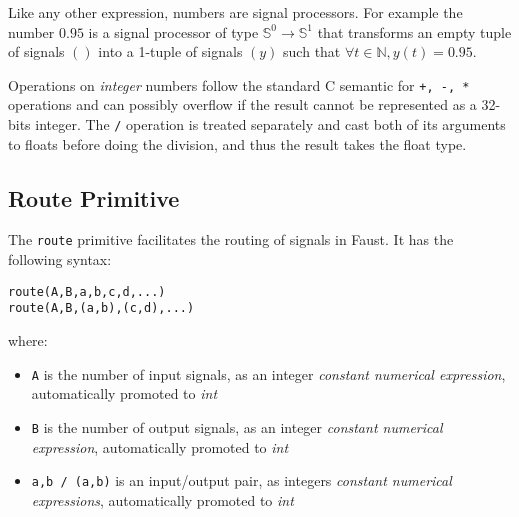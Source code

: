 Like any other \faust expression, numbers are signal processors. For example the number $0.95$ is a signal processor of type $\mathbb{S}^{0}\rightarrow\mathbb{S}^{1}$ that transforms an empty tuple of signals $()$ into a 1-tuple of signals $(y)$ such that $\forall t\in\mathbb{N}, y(t)=0.95$.

Operations on \textit{integer} numbers follow the standard C semantic for \lstinline'+, -, *' operations and can possibly overflow if the result cannot be represented as a 32-bits integer. The \lstinline'/' operation is treated separately and cast both of its arguments to floats before doing the division, and thus the result takes the float type.



\subsection{Route Primitive }

The  \lstinline'route' primitive facilitates the routing of signals in Faust. It has the following syntax:

\begin{lstlisting}
route(A,B,a,b,c,d,...)
route(A,B,(a,b),(c,d),...)
\end{lstlisting}

where:

\begin{itemize}
	\item \lstinline'A' is the number of input signals, as an integer \textit{constant numerical expression}, automatically promoted to \textit{int}
	\item \lstinline'B' is the number of output signals, as an integer \textit{constant numerical expression}, automatically promoted to \textit{int}
	\item \lstinline'a,b / (a,b)' is an input/output pair, as integers \textit{constant numerical expressions}, automatically promoted to \textit{int}
\end{itemize}

